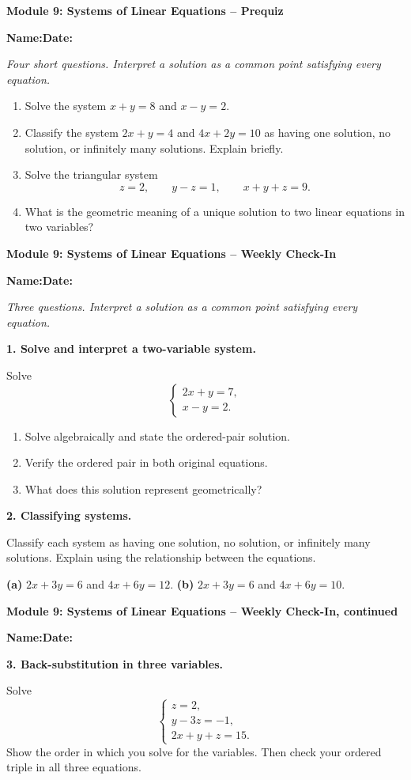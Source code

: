 \documentclass[11pt]{article}
\newcommand{\assessmenttitle}[2]{%
  {\Large\bfseries Module #1: #2}\par\vspace{3pt}
}
\newcommand{\studentline}{%
\noindent\textbf{Name:}\hspace{2.6in}\textbf{Date:}\hspace{1.15in}\par\vspace{7pt}}
\newcommand{\directions}[1]{\textit{#1}\par\vspace{4pt}}
\newcommand{\answerblank}[1]{\vspace{#1}}
\begin{document}
\assessmenttitle{9}{Systems of Linear Equations -- Prequiz}
\studentline
\directions{Four short questions. Interpret a solution as a common point satisfying every equation.}
\begin{enumerate}
\item Solve the system $x+y=8$ and $x-y=2$.
\answerblank{0.52in}
\item Classify the system $2x+y=4$ and $4x+2y=10$ as having one solution, no solution, or infinitely many solutions. Explain briefly.
\answerblank{0.62in}
\item Solve the triangular system
\[
z=2,\qquad y-z=1,\qquad x+y+z=9.
\]
\answerblank{0.72in}
\item What is the geometric meaning of a unique solution to two linear equations in two variables?
\answerblank{0.48in}
\end{enumerate}
\newpage

\assessmenttitle{9}{Systems of Linear Equations -- Weekly Check-In}
\studentline
\directions{Three questions. Interpret a solution as a common point satisfying every equation.}
\textbf{1. Solve and interpret a two-variable system.}

Solve
\[
\begin{cases}
2x+y=7,\\
x-y=2.
\end{cases}
\]
\begin{enumerate}[label=(\alph*),leftmargin=0.35in]
\item Solve algebraically and state the ordered-pair solution.
\answerblank{0.85in}
\item Verify the ordered pair in both original equations.
\answerblank{0.55in}
\item What does this solution represent geometrically?
\answerblank{0.42in}
\end{enumerate}

\textbf{2. Classifying systems.}

Classify each system as having one solution, no solution, or infinitely many solutions. Explain using the relationship between the equations.

\textbf{(a)} $2x+3y=6$ and $4x+6y=12$.\hfill
\textbf{(b)} $2x+3y=6$ and $4x+6y=10$.
\answerblank{1.05in}
\newpage

\assessmenttitle{9}{Systems of Linear Equations -- Weekly Check-In, continued}
\studentline
\textbf{3. Back-substitution in three variables.}

Solve
\[
\begin{cases}
z=2,\\
y-3z=-1,\\
2x+y+z=15.
\end{cases}
\]
Show the order in which you solve for the variables. Then check your ordered triple in all three equations.
\answerblank{4.35in}
\end{document}
